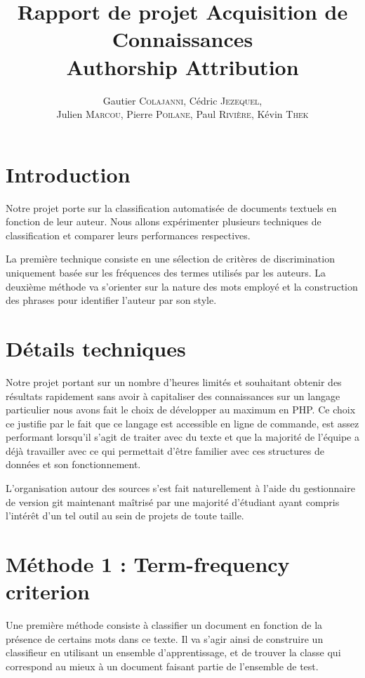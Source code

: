 \documentclass[a4paper]{article}
\author{Gautier \textsc{Colajanni}, Cédric \textsc{Jezequel},\\ Julien \textsc{Marcou}, Pierre \textsc{Poilane}, Paul \textsc{Rivière}, Kévin \textsc{Thek}}
\title{Rapport de projet Acquisition de Connaissances \\ Authorship Attribution}
\begin{document}
\maketitle

\section{Introduction}
Notre projet porte sur la classification automatisée de documents textuels en fonction de leur auteur. Nous allons expérimenter plusieurs techniques de classification et comparer leurs performances respectives.

La première technique consiste en une sélection de critères de discrimination uniquement basée sur les fréquences des termes utilisés par les auteurs. La deuxième méthode va s'orienter sur la nature des mots employé et la construction des phrases pour identifier l'auteur par son style.


\section{Détails techniques}

Notre projet portant sur un nombre d'heures limités et souhaitant obtenir des résultats rapidement sans avoir à capitaliser des connaissances sur un langage particulier nous avons fait le choix de développer au maximum en PHP. Ce choix ce justifie par le fait que ce langage est accessible en ligne de commande, est assez performant lorsqu'il s'agit de traiter avec du texte et que la majorité de l'équipe a déjà travailler avec ce qui permettait d'être familier avec ces structures de données et son fonctionnement.

L'organisation autour des sources s'est fait naturellement à l'aide du gestionnaire de version git maintenant maîtrisé par une majorité d'étudiant ayant compris l'intérêt d'un tel outil au sein de projets de toute taille.

\section{Méthode 1 : Term-frequency criterion}
Une première méthode consiste à classifier un document en fonction de la présence de certains mots dans ce texte. Il va s'agir ainsi de construire un classifieur en utilisant un ensemble d'apprentissage, et de trouver la classe qui correspond au mieux à un document faisant partie de l'ensemble de test.
\end{document}
